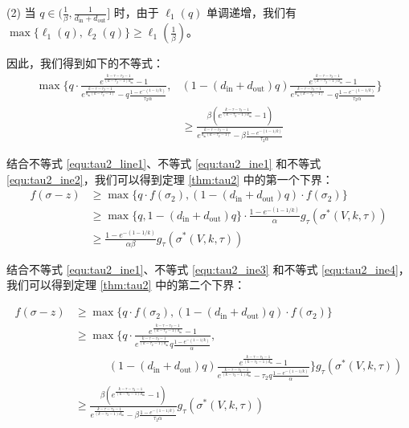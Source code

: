 (2) 当 $q \in (\frac{1}{\beta},\frac{1}{d_{\text{in}}+d_{\text{out}}}]$ 时，由于 $\ell_1(q)$ 单调递增，我们有 $\max\{\ell_1(q),\ell_2(q)\}\ge \ell_1(\frac{1}{\beta})$。

因此，我们得到如下的不等式：
\begin{align}
\max\{ q \cdot \frac{e^{\frac{k-\tau-\tau_2-1}{(k-\tau_2-1)d_{\text{in}}}}-1}{e^{\frac{k-\tau-\tau_2-1}
{d_{\text{in}}(k-\tau_2-1)}}-q \frac{1-e^{-(1-1/k)}}{\tau_2\alpha} } ,& (1-(d_{\text{in}} + d_{\text{out}})q) \frac{e^{\frac{k-\tau-\tau_2-1}{(k-\tau_2-1)d_{\text{in}}}}-1}{e^{\frac{k-\tau-\tau_2-1}
{d_{\text{in}}(k-\tau_2-1)}}-q \frac{1-e^{-(1-1/k)}}{\tau_2\alpha} } \} \nonumber \\& \ge
\frac{\beta(e^{\frac{k-\tau-\tau_2-1}{(k-\tau_2-1)d_{\text{in}}}}-1)}{e^{\frac{k-\tau-\tau_2-1}
{d_{\text{in}}(k-\tau_2-1)}}-\beta \frac{1-e^{-(1-1/k)}}{\tau_2\alpha} } \label{equ:tau2_ine4}
\end{align}

结合不等式 \ref{equ:tau2_line1}、不等式 \ref{equ:tau2_ine1} 和不等式 \ref{equ:tau2_ine2}，我们可以得到定理 \ref{thm:tau2} 中的第一个下界：
\begin{align}
f(\sigma -z ) & \ge \max\{ q \cdot f(\sigma_2),(1-(d_{\text{in}} + d_{\text{out}})q) \cdot f(\sigma_2)\} \\
& \ge \max\{q,1-(d_{\text{in}} + d_{\text{out}})q\} \cdot \frac{1-e^{-(1-1/k)}}{\alpha} g_\tau(\sigma^*(V,k,\tau)) \\
& \ge \frac{1-e^{-(1-1/k)}}{\alpha\beta} g_\tau(\sigma^*(V,k,\tau))
\end{align}

结合不等式 \ref{equ:tau2_ine1}、不等式 \ref{equ:tau2_ine3} 和不等式 \ref{equ:tau2_ine4}，我们可以得到定理 \ref{thm:tau2} 中的第二个下界：

\begin{align}
f(\sigma -z ) &\ge \max\{ q \cdot f(\sigma_2),(1-(d_{\text{in}} + d_{\text{out}})q) \cdot f(\sigma_2)\} \\
& \ge \max\{ q \cdot \frac{e^{\frac{k-\tau-\tau_2-1}{(k-\tau_2-1)d_{\text{in}}}}-1}{e^{\frac{k-\tau-\tau_2-1}{(k-\tau_2-1)d_{\text{in}}}} q \frac{1-e^{-(1-1/k)}}{\alpha} } ,\nonumber \\ &\quad \quad \quad (1-(d_{\text{in}} + d_{\text{out}})q) \frac{e^{\frac{k-\tau-\tau_2-1}{(k-\tau_2-1)d_{\text{in}}}}-1}{e^{\frac{k-\tau-\tau_2-1}{(k-\tau_2-1)d_{\text{in}}}}-\tau_2 q \frac{1-e^{-(1-1/k)}}{\alpha} } \} g_\tau(\sigma^*(V,k,\tau)) \\
& \ge \frac{\beta(e^{\frac{k-\tau-\tau_2-1}{(k-\tau_2-1)d_{\text{in}}}}-1)}{e^{\frac{k-\tau-\tau_2-1}{(k-\tau_2-1)d_{\text{in}}}}- \beta \frac{1-e^{-(1-1/k)}}{\tau_2\alpha} } g_\tau(\sigma^*(V,k,\tau))
\end{align}

